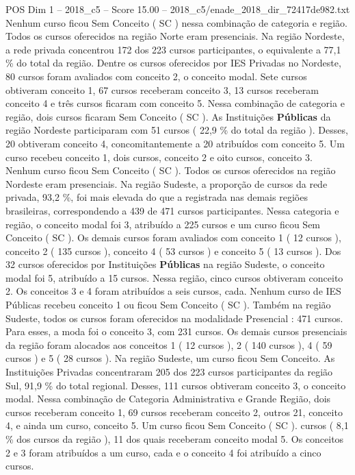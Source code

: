 \begin{textsample}{POS Dim 1 – 2018\_c5 – Score 15.00 – 2018\_c5/enade\_2018\_dir\_72417de982.txt}
Nenhum curso ficou Sem Conceito ( SC ) nessa combinação de categoria e região.
Todos os cursos oferecidos na região Norte eram presenciais.
Na região Nordeste, a rede privada concentrou 172 dos 223 cursos participantes, o equivalente a 77,1 \% do total da região.
Dentre os cursos oferecidos por IES Privadas no Nordeste, 80 cursos foram avaliados com conceito 2, o conceito modal.
Sete cursos obtiveram conceito 1, 67 cursos receberam conceito 3, 13 cursos receberam conceito 4 e três cursos ficaram com conceito 5.
Nessa combinação de categoria e região, dois cursos ficaram Sem Conceito ( SC ).
As Instituições \textbf{Públicas} da região Nordeste participaram com 51 cursos ( 22,9 \% do total da região ).
Desses, 20 obtiveram conceito 4, concomitantemente a 20 atribuídos com conceito 5.
Um curso recebeu conceito 1, dois cursos, conceito 2 e oito cursos, conceito 3.
Nenhum curso ficou Sem Conceito ( SC ).
Todos os cursos oferecidos na região Nordeste eram presenciais.
Na região Sudeste, a proporção de cursos da rede privada, 93,2 \%, foi mais elevada do que a registrada nas demais regiões brasileiras, correspondendo a 439 de 471 cursos participantes.
Nessa categoria e região, o conceito modal foi 3, atribuído a 225 cursos e um curso ficou Sem Conceito ( SC ).
Os demais cursos foram avaliados com conceito 1 ( 12 cursos ), conceito 2 ( 135 cursos ), conceito 4 ( 53 cursos ) e conceito 5 ( 13 cursos ).
Dos 32 cursos oferecidos por Instituições \textbf{Públicas} na região Sudeste, o conceito modal foi 5, atribuído a 15 cursos.
Nessa região, cinco cursos obtiveram conceito 2.
Os conceitos 3 e 4 foram atribuídos a seis cursos, cada.
Nenhum curso de IES Públicas recebeu conceito 1 ou ficou Sem Conceito ( SC ).
Também na região Sudeste, todos os cursos foram oferecidos na modalidade Presencial : 471 cursos.
Para esses, a moda foi o conceito 3, com 231 cursos.
Os demais cursos presenciais da região foram alocados aos conceitos 1 ( 12 cursos ), 2 ( 140 cursos ), 4 ( 59 cursos ) e 5 ( 28 cursos ).
Na região Sudeste, um curso ficou Sem Conceito.
As Instituições Privadas concentraram 205 dos 223 cursos participantes da região Sul, 91,9 \% do total regional.
Desses, 111 cursos obtiveram conceito 3, o conceito modal.
Nessa combinação de Categoria Administrativa e Grande Região, dois cursos receberam conceito 1, 69 cursos receberam conceito 2, outros 21, conceito 4, e ainda um curso, conceito 5.
Um curso ficou Sem Conceito ( SC ). cursos ( 8,1 \% dos cursos da região ), 11 dos quais receberam conceito modal 5.
Os conceitos 2 e 3 foram atribuídos a um curso, cada e o conceito 4 foi atribuído a cinco cursos.

\end{textsample}
